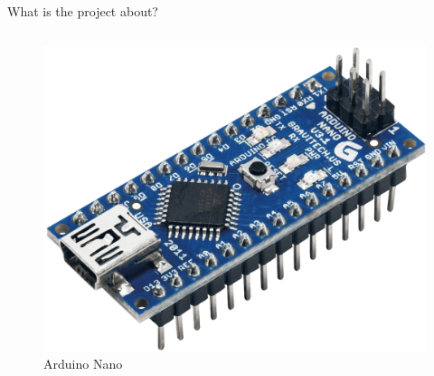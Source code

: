 \begin{frame}{What is the project about?}
\begin{onlyenv}
\begin{minipage}[0.3\textheight]{\textwidth}
\begin{columns}[T]
\begin{column}{0.5\textwidth}
	 
	 \vspace{2 mm}
	  \begin{figure}
	  \includegraphics[width=1\textwidth,height=1\textheight,keepaspectratio]{figures/Arduino_Nano.png}
	  \caption{Arduino Nano}
	  \end{figure}
	\end{column}
	\end{columns}
	
  \end{minipage}  
\end{onlyenv} 
\end{frame}